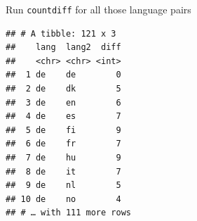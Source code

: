 \documentclass[ignorenonframetext,]{beamer}
\newenvironment{Shaded}{\begin{snugshade}}{\end{snugshade}}
\newcommand{\DataTypeTok}[1]{\textcolor[rgb]{0.13,0.29,0.53}{#1}}
\newcommand{\KeywordTok}[1]{\textcolor[rgb]{0.13,0.29,0.53}{\textbf{#1}}}
\newcommand{\NormalTok}[1]{#1}
\newcommand{\OperatorTok}[1]{\textcolor[rgb]{0.81,0.36,0.00}{\textbf{#1}}}
\newcommand{\StringTok}[1]{\textcolor[rgb]{0.31,0.60,0.02}{#1}}
\begin{document}
\begin{frame}[fragile]{Run \texttt{countdiff} for all those language
pairs}
\protect\hypertarget{run-countdiff-for-all-those-language-pairs}{}

\footnotesize

\begin{Shaded}
\end{Shaded}

\begin{verbatim}
## # A tibble: 121 x 3
##    lang  lang2  diff
##    <chr> <chr> <int>
##  1 de    de        0
##  2 de    dk        5
##  3 de    en        6
##  4 de    es        7
##  5 de    fi        9
##  6 de    fr        7
##  7 de    hu        9
##  8 de    it        7
##  9 de    nl        5
## 10 de    no        4
## # … with 111 more rows
\end{verbatim}

\normalsize

\end{frame}
\end{document}
